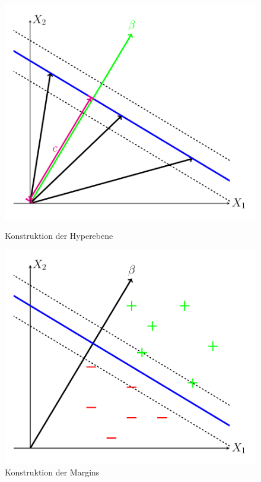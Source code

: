 \documentclass[
]{article}
\begin{document}
\begin{figure}[h]
    \centering
    \begin{minipage}{0.45\textwidth} 
        \centering
        \includegraphics[width=\textwidth,trim=0.5cm 0.5cm 0.5cm 0.5cm]{Images/decision_boundary.pdf} 
        \caption{Konstruktion der Hyperebene}
        \label{fig:Ebene}
    \end{minipage}\hfill
    \begin{minipage}{0.45\textwidth} 
        \centering
        \includegraphics[width=\textwidth,trim=0.5cm 0.5cm 0.5cm 0.5cm]{Images/guttes.pdf}
        \caption{Konstruktion der Margins}
        \label{fig:Margin}
    \end{minipage}
\end{figure}
\end{document}
